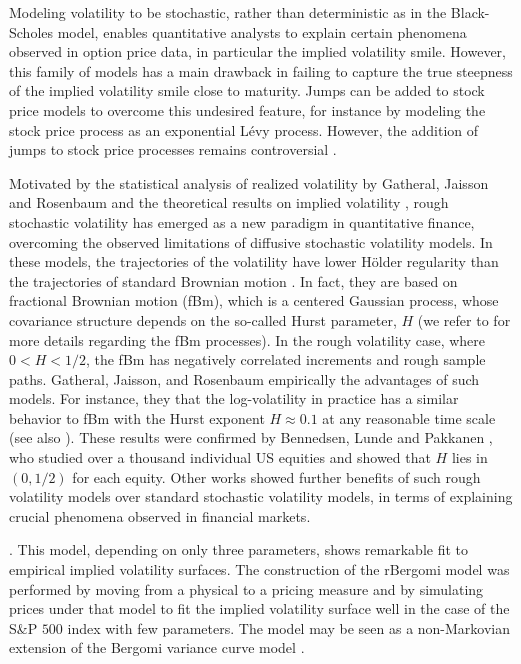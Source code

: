 Modeling volatility to be stochastic, rather than deterministic as in the Black-Scholes model, enables quantitative analysts to  explain certain phenomena observed in option price data, in particular the implied volatility smile. However, this family of models has a  main drawback in failing  to capture the true steepness of the implied volatility smile close to maturity. Jumps can be added to stock price models to overcome this undesired feature, for instance by modeling the stock price process as an exponential L\'evy process. However, the addition of jumps to stock price processes remains controversial \cite{christensen2014fact,bajgrowicz2015jumps}. 

Motivated by the statistical analysis of realized volatility by Gatheral, Jaisson and Rosenbaum \cite{gatheral2018volatility} and the theoretical results on implied volatility    \cite{alos2007short,fukasawa2011asymptotic}, rough stochastic volatility has emerged as a new paradigm in quantitative finance, overcoming the observed limitations of  diffusive stochastic volatility models. In these models, the trajectories of the volatility  have lower H\"older regularity than the trajectories of standard Brownian motion \cite{bayer2016pricing,gatheral2018volatility}. In fact, they are based on fractional Brownian motion (fBm), which  is a centered Gaussian process, whose covariance structure depends on  the so-called Hurst parameter, $H$ (we refer to  \cite{mandelbrot1968fractional,coutin07introduction,biagini2008stochastic} for more details regarding the fBm processes). In the rough volatility case, where $0<H<1/2$, the fBm has negatively correlated increments and rough sample paths.   Gatheral, Jaisson, and Rosenbaum \cite{gatheral2018volatility}  empirically  the advantages of such models. For instance, they  that the log-volatility in practice has a similar behavior to  fBm with the Hurst exponent $H \approx 0.1$ at any reasonable time scale (see also  \cite{gatheral2014volatility_2}).  These results were confirmed  by Bennedsen, Lunde and Pakkanen \cite{bennedsen2016decoupling}, who studied over a thousand individual US equities and showed that $H$ lies in $(0,1/2)$ for each equity. Other  works \cite{bennedsen2016decoupling,bayer2016pricing,gatheral2018volatility} showed further benefits of  such rough volatility models over  standard stochastic volatility models,   in terms of explaining crucial phenomena  observed in  financial markets.

. This model, depending on only three parameters, shows remarkable fit to empirical implied volatility surfaces. The construction of the rBergomi model was performed by  moving from a physical to a pricing measure and by simulating prices under that model to fit  the implied volatility surface well in the case of the S\&P $500$ index with few parameters. The model may be seen as a non-Markovian extension of the Bergomi variance curve model \cite{bergomi2005smile}.

